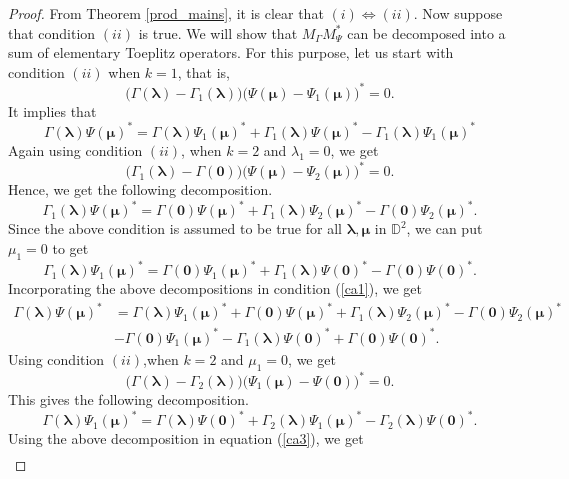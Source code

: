 \documentclass[12pt]{amsart}
\theoremstyle{definition}
\newcommand{\D}{\mathbb{D}}
\newcommand{\1}{{\mbox{\bf 1}}}
\begin{document}
\begin{proof}
From Theorem \ref{prod_mains}, it is clear that $(i) \iff (ii)$.  Now suppose that condition $(ii)$ is true.  We will show that $M_{\Gamma}M_{\Psi}^*$ can be decomposed into a sum of elementary Toeplitz operators.  For this purpose, let us start with condition $(ii)$ when $k=1$, that is, 
\[
\big( \Gamma(\bm{\lambda}) - \Gamma_1(\bm{\lambda})\big) \big(  \Psi(\bm{\mu}) - \Psi_1(\bm{\mu}) \big)^* = 0.
\]
It implies that 
\begin{equation}\label{ca1}
 \Gamma(\bm{\lambda})\Psi(\bm{\mu})^* = \Gamma(\bm{\lambda})\Psi_1(\bm{\mu})^* + \Gamma_1({\bm{\lambda}})\Psi(\bm{\mu})^* - \Gamma_1(\bm{\lambda})\Psi_1(\bm{\mu})^*
\end{equation}
Again using condition $(ii)$, when $k=2$ and $\lambda_1 = 0$, we get
\[
\big( \Gamma_1(\bm{\lambda}) - \Gamma(\bm{0})\big) \big(  \Psi(\bm{\mu}) - \Psi_2(\bm{\mu}) \big)^* = 0.
\]
Hence, we get the following decomposition.
\[
\Gamma_1(\bm{\lambda})\Psi(\bm{\mu})^* =  \Gamma(\bm{0})\Psi(\bm{\mu})^* + \Gamma_{1}(\bm{\lambda})\Psi_2(\bm{\mu})^*- \Gamma(\bm{0})\Psi_2(\bm{\mu})^*.
\]
Since the above condition is assumed to be true for all $\bm{\lambda}, \bm{\mu}$ in $\D^2$, we can put $\mu_1 = 0$ to get
\[
 \Gamma_1(\bm{\lambda})\Psi_1(\bm{\mu})^* =  \Gamma(\bm{0})\Psi_1(\bm{\mu})^* +  \Gamma_1(\bm{\lambda}) \Psi(\bm{0})^* - \Gamma(\bm{0}) \Psi(\bm{0})^* .
\]
Incorporating the above decompositions in condition (\ref{ca1}), we get
\begin{equation}\label{ca3}
\begin{split}
 \Gamma(\bm{\lambda})\Psi(\bm{\mu})^* &= \Gamma(\bm{\lambda})\Psi_1(\bm{\mu})^* 
+\Gamma(\bm{0})\Psi(\bm{\mu})^* + \Gamma_{1}(\bm{\lambda})\Psi_2(\bm{\mu})^*- \Gamma(\bm{0})\Psi_2(\bm{\mu})^*\\
&-\Gamma(\bm{0})\Psi_1(\bm{\mu})^* - \Gamma_1(\bm{\lambda}) \Psi(\bm{0})^* + \Gamma(\bm{0}) \Psi(\bm{0})^* .
\end{split}
\end{equation}
Using condition $(ii)$,when $k=2$ and $\mu_1 = 0$, we get
\[
\big(\Gamma(\bm{\lambda}) - \Gamma_{2}(\bm{\lambda})\big) \big( \Psi_1({\bm{\mu}}) - \Psi(\bm{0}) \big)^* = 0.
\]
This gives the following decomposition.
\[
\Gamma(\bm{\lambda})\Psi_1({\bm{\mu}})^* = \Gamma(\bm{\lambda}) \Psi(\bm{0})^* 
+\Gamma_{2}(\bm{\lambda}) \Psi_1({\bm{\mu}})^* 
- \Gamma_{2}(\bm{\lambda})\Psi(\bm{0})^*.
\]
Using the above decomposition in equation (\ref{ca3}), we get
\begin{equation*}
\begin{split}

\end{split}
\end{equation*}
\end{proof}
\end{document}
